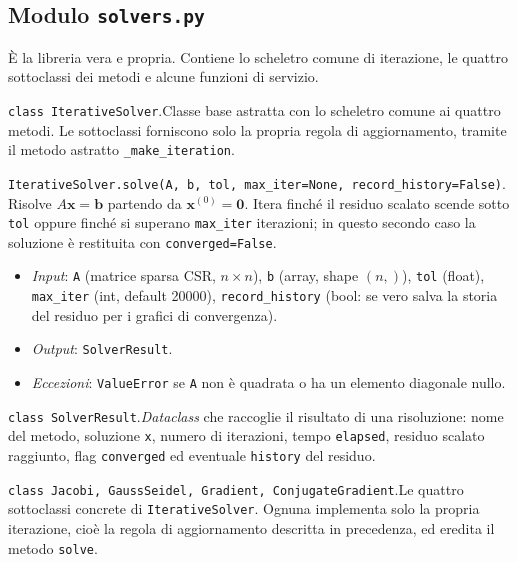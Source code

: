 \documentclass[11pt,a4paper]{article}
\begin{document}
\newcommand{\fundoc}[2]{\par\medskip\noindent\texttt{#1}.\quad #2}
\newenvironment{ioe}{\begin{itemize}[leftmargin=1.6em,topsep=2pt,itemsep=1pt,parsep=0pt]}{\end{itemize}}

\subsection{Modulo \texttt{solvers.py}}
È la libreria vera e propria. Contiene lo scheletro comune di iterazione, le
quattro sottoclassi dei metodi e alcune funzioni di servizio.

\fundoc{class IterativeSolver}{Classe base astratta con lo scheletro comune ai
quattro metodi. Le sottoclassi forniscono solo la propria regola di
aggiornamento, tramite il metodo astratto \texttt{\_make\_iteration}.}

\fundoc{IterativeSolver.solve(A, b, tol, max\_iter=None, record\_history=False)}{%
Risolve $A\mathbf{x}=\mathbf{b}$ partendo da $\mathbf{x}^{(0)}=\mathbf{0}$. Itera
finché il residuo scalato scende sotto \texttt{tol} oppure finché si superano
\texttt{max\_iter} iterazioni; in questo secondo caso la soluzione è restituita
con \texttt{converged=False}.}
\begin{ioe}
  \item \emph{Input}: \texttt{A} (matrice sparsa CSR, $n\times n$), \texttt{b}
  (array, shape $(n,)$), \texttt{tol} (float), \texttt{max\_iter} (int, default
  20000), \texttt{record\_history} (bool: se vero salva la storia del residuo per
  i grafici di convergenza).
  \item \emph{Output}: \texttt{SolverResult}.
  \item \emph{Eccezioni}: \texttt{ValueError} se \texttt{A} non è quadrata o ha
  un elemento diagonale nullo.
\end{ioe}

\fundoc{class SolverResult}{\emph{Dataclass} che raccoglie il risultato di una
risoluzione: nome del metodo, soluzione \texttt{x}, numero di iterazioni, tempo
\texttt{elapsed}, residuo scalato raggiunto, flag \texttt{converged} ed eventuale
\texttt{history} del residuo.}

\fundoc{class Jacobi, GaussSeidel, Gradient, ConjugateGradient}{Le quattro
sottoclassi concrete di \texttt{IterativeSolver}. Ognuna implementa solo la
propria iterazione, cioè la regola di aggiornamento descritta in precedenza, ed eredita il metodo \texttt{solve}.}
\end{document}
